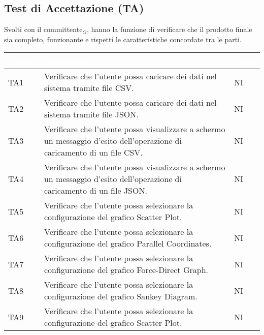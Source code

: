     \subsection{Test di Accettazione (TA)} Svolti con il committente$_G$, hanno la funzione di verificare che il prodotto
        finale sia completo, funzionante e rispetti le caratteristiche concordate tra le parti.
        \begin{center}
            \renewcommand\arraystretch{1.5}
            \centering
            \begin{longtable}{|p{1.5cm}|p{11cm}|p{1cm}|}
            \hline
            \rowcolor[HTML]{036400}
            \textcolor{white}{\textbf{Codice}} & \textcolor{white}{\textbf{Descrizione}} & \textcolor{white}{\textbf{Stato}} \\ \hline
                \rowcolor[HTML]{EFEFEF}
                TA1 & Verificare che l’utente possa caricare dei dati nel sistema tramite file CSV. & NI\\ \hline
                \rowcolor[HTML]{C0C0C0}
                TA2 & Verificare che l’utente possa caricare dei dati nel sistema tramite file JSON. & NI\\ \hline
                \rowcolor[HTML]{EFEFEF}
                TA3 & Verificare che l’utente possa visualizzare a schermo un messaggio d’esito dell’operazione di caricamento di un file CSV.& NI\\ \hline
                \rowcolor[HTML]{C0C0C0}
                TA4 & Verificare che l’utente possa visualizzare a schermo un messaggio d’esito dell’operazione di caricamento di un file JSON.& NI\\ \hline
                \rowcolor[HTML]{EFEFEF}
                TA5 & Verificare che l’utente possa selezionare la configurazione del grafico Scatter Plot. & NI\\ \hline
                \rowcolor[HTML]{C0C0C0}
                TA6 & Verificare che l’utente possa selezionare la configurazione del grafico Parallel Coordinates. & NI\\ \hline
                \rowcolor[HTML]{EFEFEF}
                TA7 & Verificare che l’utente possa selezionare la configurazione del grafico Force-Direct Graph. & NI\\ \hline
                \rowcolor[HTML]{C0C0C0}
                TA8 & Verificare che l’utente possa selezionare la configurazione del grafico Sankey Diagram. & NI\\ \hline
                \rowcolor[HTML]{EFEFEF}
                TA9 & Verificare che l’utente possa selezionare la configurazione del grafico Scatter Plot. & NI\\ \hline

\end{longtable}
\end{center}
